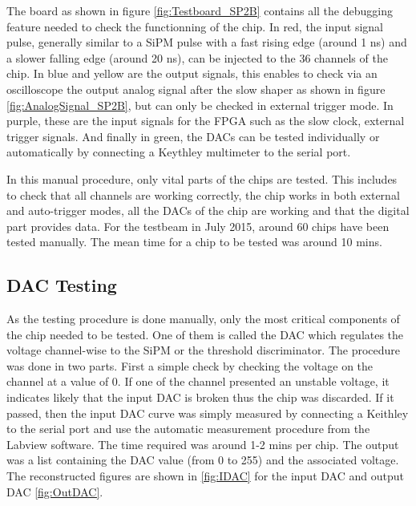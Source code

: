 The board as shown in figure \ref{fig:Testboard_SP2B} contains all the debugging feature needed to check the functionning of the chip. In red, the input signal pulse, generally similar to a SiPM pulse with a fast rising edge (around 1 ns) and a slower falling edge (around 20 ns), can be injected to the 36 channels of the chip. In blue and yellow are the output signals, this enables to check via an oscilloscope the output analog signal after the slow shaper as shown in figure \ref{fig:AnalogSignal_SP2B}, but can only be checked in external trigger mode. In purple, these are the input signals for the FPGA such as the slow clock, external trigger signals. And finally in green, the DACs can be tested individually or automatically by connecting a Keythley multimeter to the serial port.

In this manual procedure, only vital parts of the chips are tested. This includes to check that all channels are working correctly, the chip works in both external and auto-trigger modes, all the DACs of the chip are working and that the digital part provides data. For the testbeam in July 2015, around 60 chips have been tested manually. The mean time for a chip to be tested was around 10 mins.

\subsection{DAC Testing}

As the testing procedure is done manually, only the most critical components of the chip needed to be tested. One of them is called the DAC which regulates the voltage channel-wise to the SiPM or the threshold discriminator. The procedure was done in two parts. First a simple check by checking the voltage on the channel at a value of 0. If one of the channel presented an unstable voltage, it indicates likely that the input DAC is broken thus the chip was discarded. If it passed, then the input DAC curve was simply measured by connecting a Keithley to the serial port and use the automatic measurement procedure from the Labview software. The time required was around 1-2 mins per chip. The output was a list containing the DAC value (from 0 to 255) and the associated voltage. The reconstructed figures are shown in \ref{fig:IDAC} for the input DAC and output DAC \ref{fig:OutDAC}.

